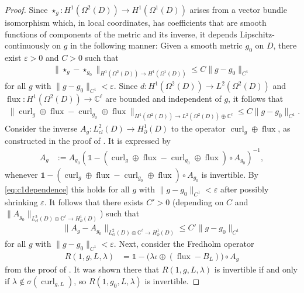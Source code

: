 \documentclass[11pt,reqno]{amsart}
\DeclareMathOperator{\curl}{curl}
\DeclareMathOperator{\flux}{flux}
\begin{document}
\begin{proof}
    Since $\star_g: H^1(\Omega^2(D)) \to H^1(\Omega^1(D))$ arises from a vector bundle isomorphism which, in local coordinates, has coefficients that are smooth functions of components of the metric and its inverse, it depends Lipschitz-continuously on $g$ in the following manner: Given a smooth metric $g_0$ on $D$, there exist $\varepsilon > 0$ and $C > 0$ such that
    \begin{align}
        \label{eq:c1dependence}
        \| \star_{g} - \star_{g_0} \|_{H^1(\Omega^2(D)) \to H^1(\Omega^1(D))} \leq C \| g - g_0 \|_{C^1} 
    \end{align}
    for all $g$ with $\| g - g_0 \|_{C^1} < \varepsilon$. Since $d: H^1(\Omega^2(D)) \to L^2(\Omega^2(D))$ and $\flux: H^1(\Omega^2(D)) \to \mathbb C^\ell$ are bounded and independent of $g$, it follows that
    \begin{align}
        \label{eq:c1dependence}
        \| \curl_g \oplus \flux - \curl_{g_0} \oplus \flux \|_{H^1(\Omega^2(D)) \to L^2(\Omega^2(D)) \oplus \mathbb C^\ell} \leq C \| g - g_0 \|_{C^1}.
    \end{align}
    Consider the inverse $A_{g}: L^2_{cl}(D) \to H^1_\partial(D)$ to the operator $\curl_g \oplus \flux$, as constructed in the proof of . It is expressed by
    \begin{align*}
        A_g &:= A_{g_0}(\mathds{1} - (\curl_{g} \oplus \flux - \curl_{g_0} \oplus \flux) \circ A_{g_0})^{-1},
    \end{align*}
    whenever $\mathds{1} - (\curl_{g} \oplus \flux - \curl_{g_0} \oplus \flux) \circ A_{g_0}$ is invertible. By \eqref{eq:c1dependence} this holds for all $g$ with $\| g - g_0 \|_{C^1} < \varepsilon$ after possibly shrinking $\varepsilon$. It follows that there exists $C' > 0$ (depending on $C$ and $\|A_{g_0}\|_{L^2_{cl}(D)\oplus \mathbb C^\ell \to H^1_\partial(D)}$) such that
    \begin{align*}
        \| A_{g} - A_{g_0} \|_{L^2_{cl}(D)\oplus \mathbb C^\ell \to H^1_\partial(D)} \leq C' \| g - g_0 \|_{C^1}
    \end{align*}
    for all $g$ with $\| g - g_0 \|_{C^1} < \varepsilon$. Next, consider the Fredholm operator
    \begin{align*}
        R(1,g,L,\lambda) &= \mathds{1} - \big( \lambda \iota \oplus (\flux - B_L) \big) \circ A_g
    \end{align*}
    from the proof of . It was shown there that $R(1,g,L,\lambda)$ is invertible if and only if $\lambda \not\in \sigma(\curl_{g,L})$, so $R(1,g_0,L,\lambda)$ is invertible.

\end{proof}
\end{document}
